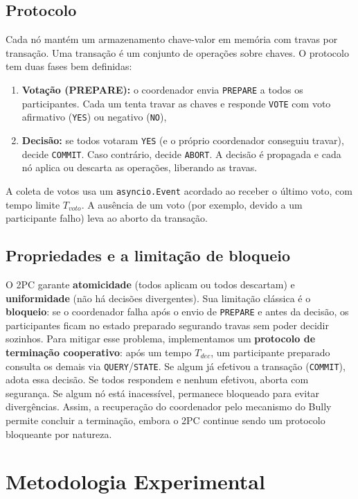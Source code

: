 \documentclass[journal]{IEEEtran}
\begin{document}
\subsection{Protocolo}
Cada nó mantém um armazenamento chave-valor em memória com travas por transação. Uma transação é um conjunto de operações sobre chaves. O protocolo tem duas fases bem definidas:
\begin{enumerate}
    \item \textbf{Votação (PREPARE):} o coordenador envia \texttt{PREPARE} a todos os participantes. Cada um tenta travar as chaves e responde \texttt{VOTE} com voto afirmativo (\texttt{YES}) ou negativo (\texttt{NO}),
    \item \textbf{Decisão:} se todos votaram \texttt{YES} (e o próprio coordenador conseguiu travar), decide \texttt{COMMIT}. Caso contrário, decide \texttt{ABORT}. A decisão é propagada e cada nó aplica ou descarta as operações, liberando as travas.
\end{enumerate}
A coleta de votos usa um \texttt{asyncio.Event} acordado ao receber o último voto, com tempo limite $T_{voto}$. A ausência de um voto (por exemplo, devido a um participante falho) leva ao aborto da transação.

\subsection{Propriedades e a limitação de bloqueio}
O 2PC garante \textbf{atomicidade} (todos aplicam ou todos descartam) e \textbf{uniformidade} (não há decisões divergentes). Sua limitação clássica é o \textbf{bloqueio}: se o coordenador falha após o envio de \texttt{PREPARE} e antes da decisão, os participantes ficam no estado preparado segurando travas sem poder decidir sozinhos. Para mitigar esse problema, implementamos um \textbf{protocolo de terminação cooperativo}: após um tempo $T_{dec}$, um participante preparado consulta os demais via \texttt{QUERY}/\texttt{STATE}. Se algum já efetivou a transação (\texttt{COMMIT}), adota essa decisão. Se todos respondem e nenhum efetivou, aborta com segurança. Se algum nó está inacessível, permanece bloqueado para evitar divergências. Assim, a recuperação do coordenador pelo mecanismo do Bully permite concluir a terminação, embora o 2PC continue sendo um protocolo bloqueante por natureza.

\section{Metodologia Experimental}
\end{document}
